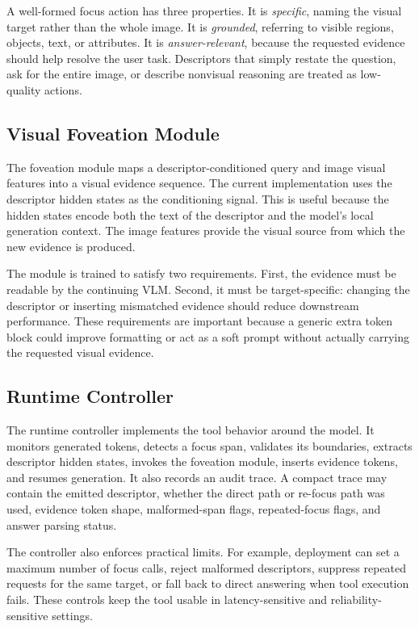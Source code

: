 \documentclass[10pt,twocolumn]{article}
\begin{document}
A well-formed focus action has three properties. It is \emph{specific}, naming the visual target rather than the whole image. It is \emph{grounded}, referring to visible regions, objects, text, or attributes. It is \emph{answer-relevant}, because the requested evidence should help resolve the user task. Descriptors that simply restate the question, ask for the entire image, or describe nonvisual reasoning are treated as low-quality actions.

\subsection{Visual Foveation Module}

The foveation module maps a descriptor-conditioned query and image visual features into a visual evidence sequence. The current implementation uses the descriptor hidden states as the conditioning signal. This is useful because the hidden states encode both the text of the descriptor and the model's local generation context. The image features provide the visual source from which the new evidence is produced.

The module is trained to satisfy two requirements. First, the evidence must be readable by the continuing VLM. Second, it must be target-specific: changing the descriptor or inserting mismatched evidence should reduce downstream performance. These requirements are important because a generic extra token block could improve formatting or act as a soft prompt without actually carrying the requested visual evidence.

\subsection{Runtime Controller}

The runtime controller implements the tool behavior around the model. It monitors generated tokens, detects a focus span, validates its boundaries, extracts descriptor hidden states, invokes the foveation module, inserts evidence tokens, and resumes generation. It also records an audit trace. A compact trace may contain the emitted descriptor, whether the direct path or re-focus path was used, evidence token shape, malformed-span flags, repeated-focus flags, and answer parsing status.

The controller also enforces practical limits. For example, deployment can set a maximum number of focus calls, reject malformed descriptors, suppress repeated requests for the same target, or fall back to direct answering when tool execution fails. These controls keep the tool usable in latency-sensitive and reliability-sensitive settings.
\end{document}
